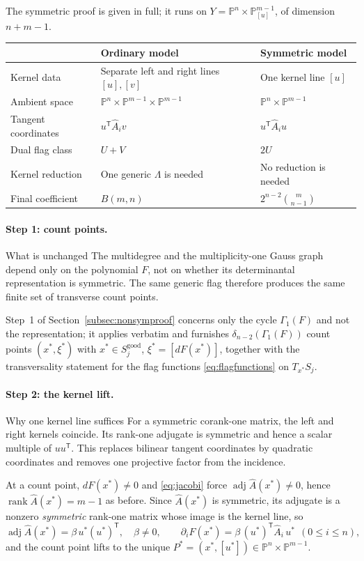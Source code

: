 \documentclass[acmsmall,screen,nonacm]{acmart}
\theoremstyle{definition}
\theoremstyle{remark}
\DeclareMathOperator{\rank}{rank}
\DeclareMathOperator{\adj}{adj}
\newcommand{\PP}{\mathbb{P}}
\newcommand{\pdeg}{\delta}
\newcommand{\Gone}{\Gamma_{\!1}}
\begin{document}
The symmetric proof is given in full; it runs on
$Y=\PP^n\times\PP^{m-1}_{[u]}$, of dimension $n+m-1$.

\begin{center}
\small
\begin{tabularx}{\textwidth}{@{}p{}XX@{}}
\toprule
& Ordinary model & Symmetric model \\
\midrule
Kernel data & Separate left and right lines $[u],[v]$ & One kernel line $[u]$ \\
Ambient space & $\PP^n\times\PP^{m-1}\times\PP^{m-1}$ & $\PP^n\times\PP^{m-1}$ \\
Tangent coordinates & $u^{\mathsf T}\widehat A_i v$ & $u^{\mathsf T}\widehat A_i u$ \\
Dual flag class & $U+V$ & $2U$ \\
Kernel reduction & One generic $\Lambda$ is needed & No reduction is needed \\
Final coefficient & $B(m,n)$ & $2^{n-2}\binom{m}{n-1}$ \\
\bottomrule
\end{tabularx}
\end{center}

\paragraph{Step 1: count points.}
\begin{detailbox}{What is unchanged}
The multidegree and the multiplicity-one Gauss graph depend only on the
polynomial $F$, not on whether its determinantal representation is symmetric.
The same generic flag therefore produces the same finite set of transverse
count points.
\end{detailbox}
Step~1 of Section~\ref{subsec:nonsymproof} concerns only the cycle
$\Gone(F)$ and not the representation; it applies verbatim and
furnishes $\pdeg_{n-2}(\Gone(F))$ count points $(x^*,\xi^*)$ with
$x^*\in S_j^{\mathrm{good}}$, $\xi^*=[dF(x^*)]$, together with the
transversality statement for the flag functions
\eqref{eq:flagfunctions} on $T_{x^*}S_j$.

\paragraph{Step 2: the kernel lift.}
\begin{detailbox}{Why one kernel line suffices}
For a symmetric corank-one matrix, the left and right kernels coincide.  Its
rank-one adjugate is symmetric and hence a scalar multiple of $uu^{\mathsf T}$.
This replaces bilinear tangent coordinates by quadratic coordinates and
removes one projective factor from the incidence.
\end{detailbox}
At a count point, $dF(x^*)\ne0$ and \eqref{eq:jacobi} force
$\adj\widehat A(x^*)\ne0$, hence $\rank\widehat A(x^*)=m-1$ as
before.  Since $\widehat A(x^*)$ is symmetric, its adjugate is a
nonzero \emph{symmetric} rank-one matrix whose image is the kernel
line, so
\[
  \adj\widehat A(x^*)=\beta\,u^*(u^*)^{\mathsf T},\quad\beta\ne0,
  \qquad
  \partial_iF(x^*)=\beta\,(u^*)^{\mathsf T}\widehat A_i\,u^*\ \
  (0\le i\le n),
\]
and the count point lifts to the unique
$P^*=(x^*,[u^*])\in\PP^n\times\PP^{m-1}$.
\end{document}
